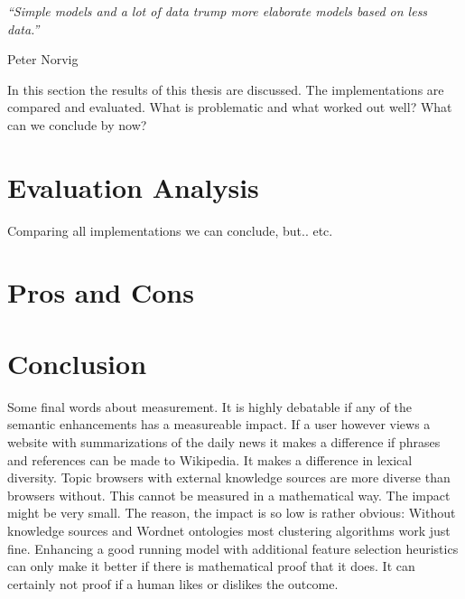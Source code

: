 \epigraph{\emph{
  ``Simple models and a lot of data trump more elaborate models based on less data.''
}}{ Peter Norvig }

In this section the results of this thesis are discussed. The implementations are compared and evaluated. What is problematic and what worked out well? What can we conclude by now?

\section{Evaluation Analysis}
Comparing all implementations we can conclude, but.. etc.

\section{Pros and Cons}

\section{Conclusion}
  Some final words about measurement. It is highly debatable if any of the semantic enhancements has a measureable impact. If a user however views a website with summarizations of the daily news it makes a difference if phrases and references can be made to Wikipedia. It makes a difference in lexical diversity. Topic browsers with external knowledge sources are more diverse than browsers without. This cannot be measured in a mathematical way. The impact might be very small. The reason, the impact is so low is rather obvious: Without knowledge sources and Wordnet ontologies most clustering algorithms work just fine. Enhancing a good running model with additional feature selection heuristics can only make it better if there is mathematical proof that it does. It can certainly not proof if a human likes or dislikes the outcome.



